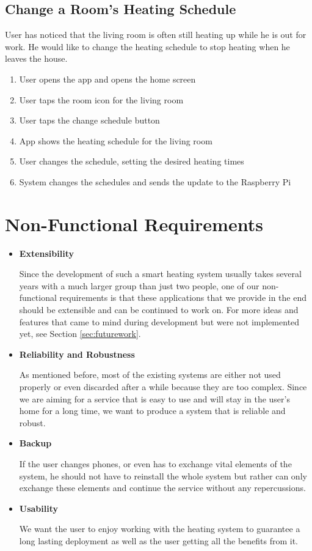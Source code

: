 \subsection*{Change a Room's Heating Schedule}
User has noticed that the living room is often still heating up while he is out for work. He would like to change the heating schedule to stop heating when he leaves the house.
\begin{enumerate}
    \item User opens the app and opens the home screen
    \item User taps the room icon for the living room
    \item User taps the change schedule button
    \item App shows the heating schedule for the living room
    \item User changes the schedule, setting the desired heating times
    \item System changes the schedules and sends the update to the Raspberry Pi
\end{enumerate}

\section{Non-Functional Requirements}

\begin{itemize}
    \item \textbf{Extensibility}
    
    Since the development of such a smart heating system usually takes several years with a much larger group than just two people, one of our non-functional requirements is that these applications that we provide in the end should be extensible and can be continued to work on. For more ideas and features that came to mind during development but were not implemented yet, see Section \ref{sec:futurework}.
    \item \textbf{Reliability and Robustness}
    
    As mentioned before, most of the existing systems are either not used properly or even discarded after a while because they are too complex. Since we are aiming for a service that is easy to use and will stay in the user's home for a long time, we want to produce a system that is reliable and robust.
    \item \textbf{Backup}
    
    If the user changes phones, or even has to exchange vital elements of the system, he should not have to reinstall the whole system but rather can only exchange these elements and continue the service without any repercussions.
    
    \item \textbf{Usability}
    
    We want the user to enjoy working with the heating system to guarantee a long lasting deployment as well as the user getting all the benefits from it. 
\end{itemize}




